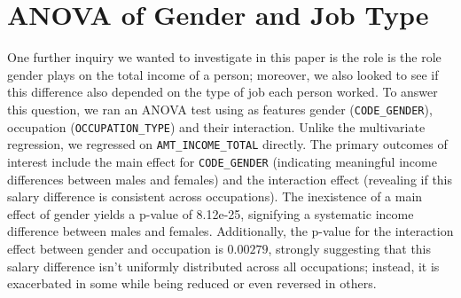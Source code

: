 \documentclass[hidelinks,12pt]{article}
\begin{document}
\section{ANOVA of Gender and Job Type}
One further inquiry we wanted to investigate in this paper is the role is the role gender plays on the total income of a person; moreover, we also looked to see if this difference also depended on the type of job each person worked. To answer this question, we ran an ANOVA test using as features gender (\verb|CODE_GENDER|), occupation (\verb|OCCUPATION_TYPE|) and their interaction. Unlike the multivariate regression, we regressed on \verb|AMT_INCOME_TOTAL| directly. The primary outcomes of interest include the main effect for \verb|CODE_GENDER| (indicating meaningful income differences between males and females) and the interaction effect (revealing if this salary difference is consistent across occupations). The inexistence of a main effect of gender yields a p-value of 8.12e-25, signifying a systematic income difference between males and females. Additionally, the p-value for the interaction effect between gender and occupation is $0.00279$, strongly suggesting that this salary difference isn’t uniformly distributed across all occupations; instead, it is exacerbated in some while being reduced or even reversed in others.
\end{document}
